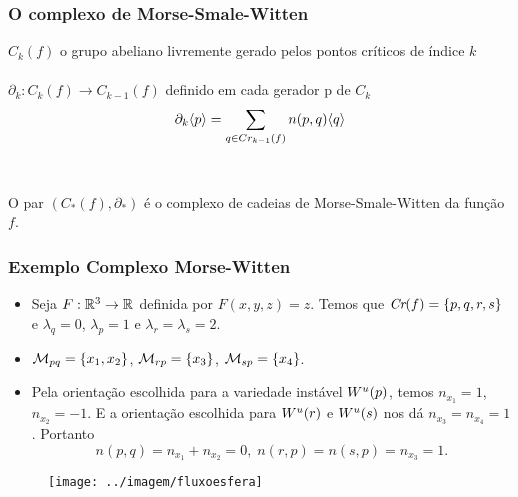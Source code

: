 \documentclass{beamer}
\begin{document}
	\begin{frame}
		\frametitle{O complexo de Morse-Smale-Witten}
		\begin{definicao}
			$C_{k}(f)$ o grupo abeliano livremente gerado pelos pontos críticos de índice $k$ 
			\\~\\
			$\partial_{k}: C_{k}(f)\to C_{k-1}(f)$ definido em cada gerador p de $C_{k}$
			$$
			\partial_{k}\langle p\rangle=\sum_{q \in Cr_{k-1}(f)}n(p,q)\langle q\rangle
			$$
			\\~\\
			O par $(C_{*}(f), \partial_{*})$ é o complexo de cadeias de Morse-Smale-Witten  da função $f$.
		\end{definicao}
	\end{frame}
	
	\begin{frame}
		
		\frametitle{Exemplo Complexo Morse-Witten}
		
		\begin{minipage}[t]{0.5\linewidth}
			
			\begin{itemize}
				\item Seja $F:\mathbb{R}^{3} \to \mathbb{R}^{}$ definida por $F(x, y, z) = z$. Temos que $\textit{Cr}(f) = \{p,q,r,s\}$ e $\lambda_{q} = 0$, $\lambda_{p} = 1$ e $\lambda_{r}=\lambda_{s} = 2$. 
				
				\item $\mathcal{M}_{pq}=\{x_{1}, x_{2}\}$, $\mathcal{M}_{rp} = \{ x_{3}\}$, $\mathcal{M}_{sp} = \{x_{4} \}$.
				
				\item Pela orientação escolhida para a variedade instável $W^{u}(p)$, temos $n_{x_{1}}=1$, $n_{x_{2}} = -1$. E a orientação escolhida para $W^{u}(r)$ e $W^{u}(s)$ nos dá $n_{x_{3}} =n_{x_{4}}= 1$. Portanto 
				$$
				n(p,q) = n_{x_{1}}+n_{x_{2}} = 0,\; n(r,p) = n(s,p)=n_{x_{3}}= 1. 
				$$			
			\end{itemize}
		\end{minipage}
		\hfill%
			\begin{minipage}[t]{0.4\linewidth}
				\begin{figure}
					\centering
					\textbf{}\par
					\texttt{[image: ../imagem/fluxoesfera]}
				\end{figure}
				
			\end{minipage}
	
	\end{frame}
	
\end{document}
